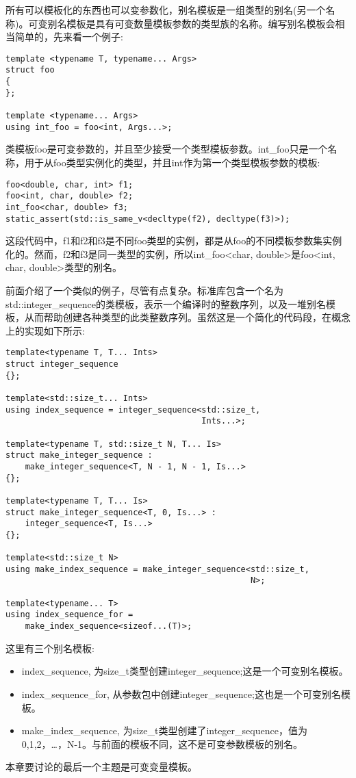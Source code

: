 所有可以模板化的东西也可以变参数化，别名模板是一组类型的别名(另一个名称)。可变别名模板是具有可变数量模板参数的类型族的名称。编写别名模板会相当简单的，先来看一个例子:

\begin{lstlisting}[style=styleCXX]
template <typename T, typename... Args>
struct foo
{
};

template <typename... Args>
using int_foo = foo<int, Args...>;
\end{lstlisting}

类模板foo是可变参数的，并且至少接受一个类型模板参数。int\_foo只是一个名称，用于从foo类型实例化的类型，并且int作为第一个类型模板参数的模板:

\begin{lstlisting}[style=styleCXX]
foo<double, char, int> f1;
foo<int, char, double> f2;
int_foo<char, double> f3;
static_assert(std::is_same_v<decltype(f2), decltype(f3)>);
\end{lstlisting}

这段代码中，f1和f2和f3是不同foo类型的实例，都是从foo的不同模板参数集实例化的。然而，f2和f3是同一类型的实例，所以int\_foo<char, double>是foo<int, char, double>类型的别名。

前面介绍了一个类似的例子，尽管有点复杂。标准库包含一个名为std::integer\_sequence的类模板，表示一个编译时的整数序列，以及一堆别名模板，从而帮助创建各种类型的此类整数序列。虽然这是一个简化的代码段，在概念上的实现如下所示:

\begin{lstlisting}[style=styleCXX]
template<typename T, T... Ints>
struct integer_sequence
{};

template<std::size_t... Ints>
using index_sequence = integer_sequence<std::size_t,
								        Ints...>;

template<typename T, std::size_t N, T... Is>
struct make_integer_sequence :
	make_integer_sequence<T, N - 1, N - 1, Is...>
{};

template<typename T, T... Is>
struct make_integer_sequence<T, 0, Is...> :
	integer_sequence<T, Is...>
{};

template<std::size_t N>
using make_index_sequence = make_integer_sequence<std::size_t,
												  N>;

template<typename... T>
using index_sequence_for =
	make_index_sequence<sizeof...(T)>;
\end{lstlisting}

这里有三个别名模板:

\begin{itemize}
\item
index\_sequence, 为size\_t类型创建integer\_sequence;这是一个可变别名模板。

\item
index\_sequence\_for, 从参数包中创建integer\_sequence;这也是一个可变别名模板。

\item
make\_index\_sequence, 为size\_t类型创建了integer\_sequence，值为0,1,2，…，N-1。与前面的模板不同，这不是可变参数模板的别名。
\end{itemize}

本章要讨论的最后一个主题是可变变量模板。










